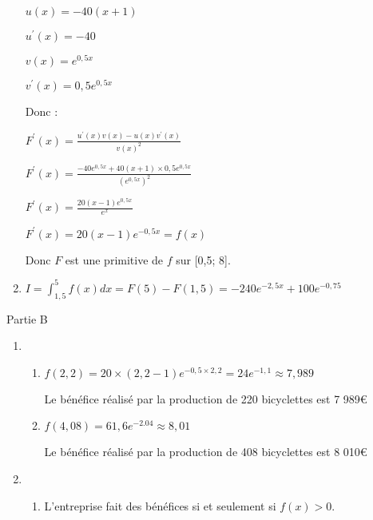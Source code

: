 \begin{corrige}
\begin{enumerate}
          $u\left(x\right)=-40\left(x+1\right)$
          \par
          $u^{\prime}\left(x\right)=-40$
          \par
          $v\left(x\right)=e^{0,5x}$
          \par
          $v^{\prime}\left(x\right)=0,5e^{0,5x}$
          \par
          Donc :
          \par
          $F^{\prime}\left(x\right)=\frac{u^{\prime}\left(x\right)v\left(x\right)-u\left(x\right)v^{\prime}\left(x\right)}{v\left(x\right)^{2}}$
          \par
          $F^{\prime}\left(x\right) = \frac{-40e^{0,5x}+40\left(x+1\right)\times 0,5e^{0,5x}}{\left(e^{0,5x}\right)^{2}}$
          \par
          $F^{\prime}\left(x\right) = \frac{20\left(x-1\right)e^{0,5x}}{e^{x}}$
          \par
          $F^{\prime}\left(x\right) = 20\left(x-1\right)e^{-0,5x}=f\left(x\right)$
          \par
          Donc $F$ est une primitive de $f$ sur [0,5; 8].
          \item
          $I=\int_{1,5}^{5}f\left(x\right)dx=F\left(5\right)-F\left(1,5\right)=-240e^{-2,5x}+100e^{-0,75}$
     \end{enumerate}
     \begin{h3}Partie B\end{h3}
     \begin{enumerate}
          \item
          \begin{enumerate}
               \item
               $f\left(2,2\right)=20\times \left(2,2-1\right)e^{-0,5\times 2,2}=24e^{-1,1}\approx 7,989$
               \par
               Le bénéfice réalisé par la production de 220 bicyclettes est 7 989€
               \item
               $f\left(4,08\right)=61,6e^{-2.04}\approx 8,01$
               \par
               Le bénéfice réalisé par la production de 408 bicyclettes est 8 010€
          \end{enumerate}
          \item
          \begin{enumerate}
               \item
               L'entreprise fait des bénéfices si et seulement si $f\left(x\right) > 0$.

\end{enumerate}
\end{enumerate}
\end{corrige}
